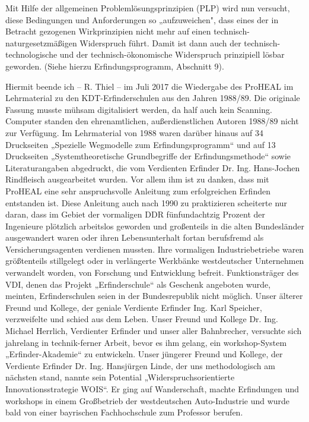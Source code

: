 \documentclass[12pt,a4paper]{article}
\begin{document}
Mit Hilfe der allgemeinen Problemlösungsprinzipien (PLP) wird nun versucht,
diese Bedingungen und Anforderungen so „aufzuweichen", dass eines der in
Betracht gezogenen Wirkprinzipien nicht mehr auf einen
technisch-naturgesetzmäßigen Widerspruch führt. Damit ist dann auch der
technisch-technologische und der technisch-ökonomische Widerspruch prinzipiell
lösbar geworden. (Siehe hierzu Erfindungsprogramm, Abschnitt 9).

Hiermit beende ich – R. Thiel – im Juli 2017 die Wiedergabe des ProHEAL im
Lehrmaterial zu den KDT-Erfinderschulen aus den Jahren 1988/89. Die originale
Fassung musste mühsam digitalisiert werden, da half auch kein
Scanning. Computer standen den ehrenamtlichen, außerdienstlichen Autoren
1988/89 nicht zur Verfügung. Im Lehrmaterial von 1988 waren darüber hinaus auf
34 Druckseiten „Spezielle Wegmodelle zum Erfindungsprogramm“ und auf 13
Druckseiten „Systemtheoretische Grundbegriffe der Erfindungsmethode“ sowie
Literaturangaben abgedruckt, die vom Verdienten Erfinder Dr. Ing. Hans-Jochen
Rindfleisch ausgearbeitet wurden. Vor allem ihm ist zu danken, dass mit
ProHEAL eine sehr anspruchsvolle Anleitung zum erfolgreichen Erfinden
entstanden ist. Diese Anleitung auch nach 1990 zu praktizieren scheiterte nur
daran, dass im Gebiet der vormaligen DDR fünfundachtzig Prozent der Ingenieure
plötzlich arbeitslos geworden und großenteils in die alten Bundesländer
ausgewandert waren oder ihren Lebensunterhalt fortan berufsfremd als
Versicherungsagenten verdienen mussten. Ihre vormaligen Industriebetriebe
waren größtenteils stillgelegt oder in verlängerte Werkbänke westdeutscher
Unternehmen verwandelt worden, von Forschung und Entwicklung
befreit. Funktionsträger des VDI, denen das Projekt „Erfinderschule“ als
Geschenk angeboten wurde, meinten, Erfinderschulen seien in der Bundesrepublik
nicht möglich. Unser älterer Freund und Kollege, der geniale Verdiente
Erfinder Ing. Karl Speicher, verzweifelte und schied aus dem Leben. Unser
Freund und Kollege Dr. Ing. Michael Herrlich, Verdienter Erfinder und unser
aller Bahnbrecher, versuchte sich jahrelang in technik-ferner Arbeit, bevor es
ihm gelang, ein workshop-System „Erfinder-Akademie“ zu entwickeln. Unser
jüngerer Freund und Kollege, der Verdiente Erfinder Dr. Ing. Hansjürgen Linde,
der uns methodologisch am nächsten stand, nannte sein Potential
„Widerspruchsorientierte Innovationsstrategie WOIS“. Er ging auf Wanderschaft,
machte Erfindungen und workshops in einem Großbetrieb der westdeutschen
Auto-Industrie und wurde bald von einer bayrischen Fachhochschule zum
Professor berufen.
\end{document}
